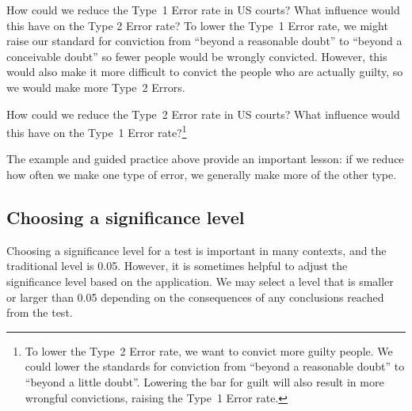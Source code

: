 \begin{example}{How could we reduce the Type~1 Error rate in US courts? What influence would this have on the Type 2 Error rate?}
To lower the Type~1 Error rate, we might raise our standard for conviction from ``beyond a reasonable doubt'' to ``beyond a conceivable doubt'' so fewer people would be wrongly convicted. However, this would also make it more difficult to convict the people who are actually guilty, so we would make more Type~2 Errors.
\end{example}

\begin{exercise} \label{howToReduceType2ErrorsInUSCourts}
How could we reduce the Type~2 Error rate in US courts? What influence would this have on the Type~1 Error rate?\footnote{To lower the Type~2 Error rate, we want to convict more guilty people. We could lower the standards for conviction from ``beyond a reasonable doubt'' to ``beyond a little doubt''. Lowering the bar for guilt will also result in more wrongful convictions, raising the Type~1 Error rate.}
\end{exercise}


The example and guided practice above provide an important lesson: if we reduce how often we make one type of error, we generally make more of the other type.



\subsection{Choosing a significance level}
\label{significanceLevel}


Choosing a significance level for a test is important in many contexts, and the traditional level is 0.05. However, it is sometimes helpful to adjust the significance level based on the application. We may select a level that is smaller or larger than 0.05 depending on the consequences of any conclusions reached from the test.

